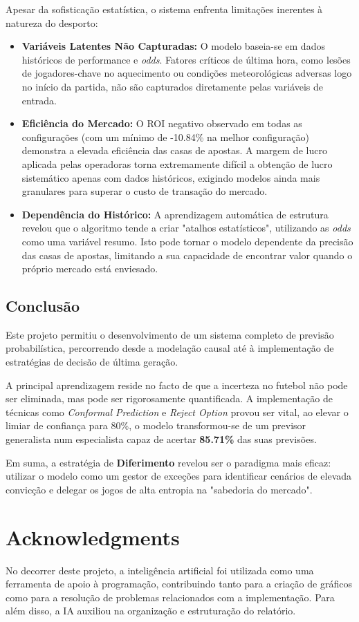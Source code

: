 \documentclass[10pt]{article}
\begin{document}
Apesar da sofisticação estatística, o sistema enfrenta limitações inerentes à natureza do desporto:
\begin{itemize}
    \item \textbf{Variáveis Latentes Não Capturadas:} O modelo baseia-se em dados históricos de performance e \textit{odds}. Fatores críticos de última hora, como lesões de jogadores-chave no aquecimento ou condições meteorológicas adversas logo no início da partida, não são capturados diretamente pelas variáveis de entrada.
    \item \textbf{Eficiência do Mercado:} O ROI negativo observado em todas as configurações (com um mínimo de -10.84\% na melhor configuração)  demonstra a elevada eficiência das casas de apostas. A margem de lucro aplicada pelas operadoras torna extremamente difícil a obtenção de lucro sistemático apenas com dados históricos, exigindo modelos ainda mais granulares para superar o custo de transação do mercado.
    \item \textbf{Dependência do Histórico:} A aprendizagem automática de estrutura revelou que o algoritmo tende a criar "atalhos estatísticos", utilizando as \textit{odds} como uma variável resumo. Isto pode tornar o modelo dependente da precisão das casas de apostas, limitando a sua capacidade de encontrar valor quando o próprio mercado está enviesado.
\end{itemize}

\subsection{Conclusão}

Este projeto permitiu o desenvolvimento de um sistema completo de previsão probabilística, percorrendo desde a modelação causal até à implementação de estratégias de decisão de última geração. 

A principal aprendizagem reside no facto de que a incerteza no futebol não pode ser eliminada, mas pode ser rigorosamente quantificada. A implementação de técnicas como \textit{Conformal Prediction} e \textit{Reject Option} provou ser vital, ao elevar o limiar de confiança para 80\%, o modelo transformou-se de um previsor generalista num especialista capaz de acertar \textbf{85.71\%} das suas previsões. 

Em suma, a estratégia de \textbf{Diferimento} revelou ser o paradigma mais eficaz: utilizar o modelo como um gestor de exceções para identificar cenários de elevada convicção e delegar os jogos de alta entropia na "sabedoria do mercado". 

\section{Acknowledgments}
No decorrer deste projeto, a inteligência artificial foi utilizada como uma ferramenta de apoio à programação, contribuindo tanto para a criação de gráficos como para a resolução de problemas relacionados com a implementação. Para além disso, a IA auxiliou na organização e estruturação do relatório.
\end{document}
